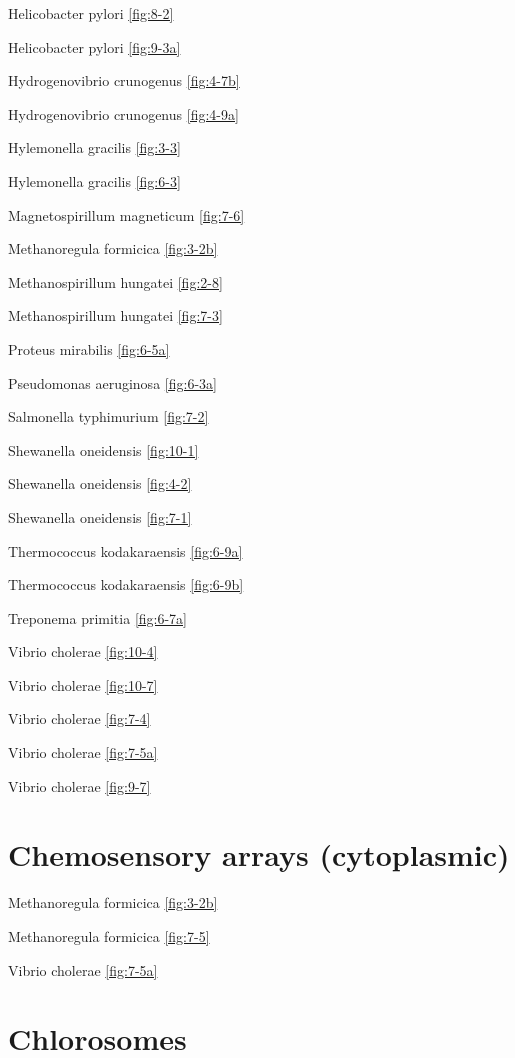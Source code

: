 \documentclass[]{tufte-book}
\begin{document}
Helicobacter pylori \ref{fig:8-2}

Helicobacter pylori \ref{fig:9-3a}

Hydrogenovibrio crunogenus \ref{fig:4-7b}

Hydrogenovibrio crunogenus \ref{fig:4-9a}

Hylemonella gracilis \ref{fig:3-3}

Hylemonella gracilis \ref{fig:6-3}

Magnetospirillum magneticum \ref{fig:7-6}

Methanoregula formicica \ref{fig:3-2b}

Methanospirillum hungatei \ref{fig:2-8}

Methanospirillum hungatei \ref{fig:7-3}

Proteus mirabilis \ref{fig:6-5a}

Pseudomonas aeruginosa \ref{fig:6-3a}

Salmonella typhimurium \ref{fig:7-2}

Shewanella oneidensis \ref{fig:10-1}

Shewanella oneidensis \ref{fig:4-2}

Shewanella oneidensis \ref{fig:7-1}

Thermococcus kodakaraensis \ref{fig:6-9a}

Thermococcus kodakaraensis \ref{fig:6-9b}

Treponema primitia \ref{fig:6-7a}

Vibrio cholerae \ref{fig:10-4}

Vibrio cholerae \ref{fig:10-7}

Vibrio cholerae \ref{fig:7-4}

Vibrio cholerae \ref{fig:7-5a}

Vibrio cholerae \ref{fig:9-7}

\hypertarget{chemosensory-arrays-cytoplasmic}{%
\section*{Chemosensory arrays (cytoplasmic)}\label{chemosensory-arrays-cytoplasmic}}

Methanoregula formicica \ref{fig:3-2b}

Methanoregula formicica \ref{fig:7-5}

Vibrio cholerae \ref{fig:7-5a}

\hypertarget{chlorosomes-1}{%
\section*{Chlorosomes}\label{chlorosomes-1}}
\end{document}
